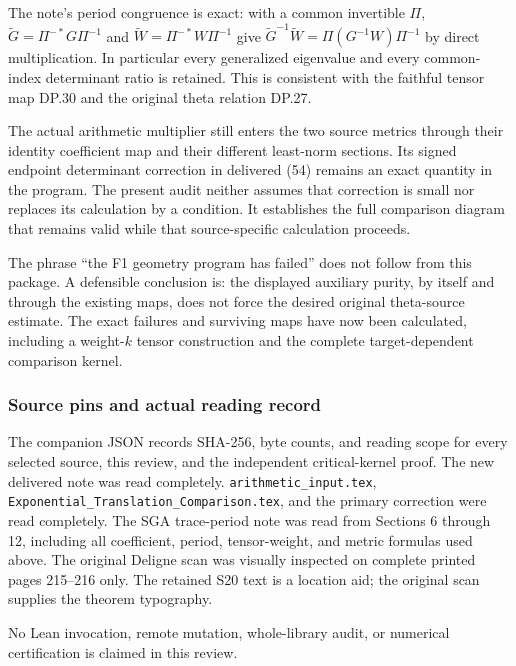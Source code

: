 \documentclass{article}
\begin{document}
The note's period congruence is exact: with a common invertible \(\Pi\), \(\widetilde G=\Pi^{-*}G\Pi^{-1}\) and \(\widetilde W=\Pi^{-*}W\Pi^{-1}\) give \(\widetilde G^{-1}\widetilde W=\Pi(G^{-1}W)\Pi^{-1}\) by direct multiplication. In particular every generalized eigenvalue and every common-index determinant ratio is retained. This is consistent with the faithful tensor map DP.30 and the original theta relation DP.27.

The actual arithmetic multiplier still enters the two source metrics through their identity coefficient map and their different least-norm sections. Its signed endpoint determinant correction in delivered (54) remains an exact quantity in the program. The present audit neither assumes that correction is small nor replaces its calculation by a condition. It establishes the full comparison diagram that remains valid while that source-specific calculation proceeds.

The phrase ``the F1 geometry program has failed'' does not follow from this package. A defensible conclusion is: the displayed auxiliary purity, by itself and through the existing maps, does not force the desired original theta-source estimate. The exact failures and surviving maps have now been calculated, including a weight-\(k\) tensor construction and the complete target-dependent comparison kernel.

\subsubsection{Source pins and actual reading record}\label{endpoint-purity_review--source-pins-and-actual-reading-record}

The companion JSON records SHA-256, byte counts, and reading scope for every selected source, this review, and the independent critical-kernel proof. The new delivered note was read completely. \nolinkurl{arithmetic_input.tex}, \nolinkurl{Exponential_Translation_Comparison.tex}, and the primary correction were read completely. The SGA trace-period note was read from Sections 6 through 12, including all coefficient, period, tensor-weight, and metric formulas used above. The original Deligne scan was visually inspected on complete printed pages 215--216 only. The retained S20 text is a location aid; the original scan supplies the theorem typography.

No Lean invocation, remote mutation, whole-library audit, or numerical certification is claimed in this review.

\endgroup
\end{document}
